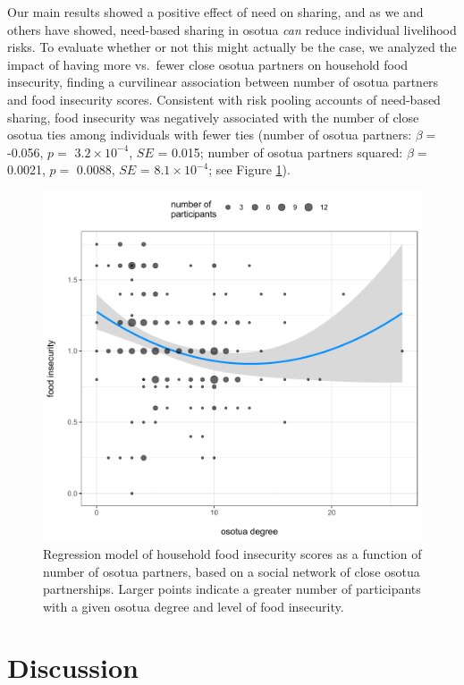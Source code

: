 \documentclass[
]{article}
\begin{document}
Our main results showed a positive effect of need on sharing, and as we and others have showed, need-based sharing in osotua \emph{can} reduce individual livelihood risks. To evaluate whether or not this might actually be the case, we analyzed the impact of having more vs.~fewer close osotua partners on household food insecurity, finding a curvilinear association between number of osotua partners and food insecurity scores. Consistent with risk pooling accounts of need-based sharing, food insecurity was negatively associated with the number of close osotua ties among individuals with fewer ties (number of osotua partners: \(\beta=\) -0.056, \(p=\) \ensuremath{3.2\times 10^{-4}}, \(SE\) = 0.015; number of osotua partners squared: \(\beta=\) 0.0021, \(p=\) 0.0088, \(SE\) = \ensuremath{8.1\times 10^{-4}}; see Figure \ref{fig:osotuainsecure}).

\begin{figure}
\centering
\includegraphics{needBasedSharing-paper_files/figure-latex/osotuainsecure-1.pdf}
\caption{\label{fig:osotuainsecure}Regression model of household food insecurity scores as a function of number of osotua partners, based on a social network of close osotua partnerships. Larger points indicate a greater number of participants with a given osotua degree and level of food insecurity.}
\end{figure}

\section*{Discussion}\label{discussion}
\end{document}
